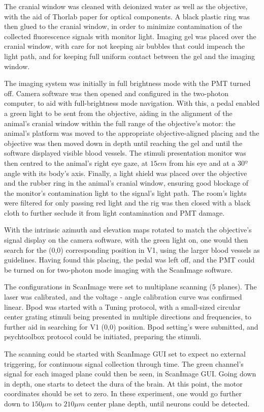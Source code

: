 The cranial window was cleaned with deionized water as well as the objective, with the aid of Thorlab paper for optical components. A black plastic ring was then glued to the cranial window, in order to minimize contamination of the collected fluorescence signals with monitor light. Imaging gel was placed over the cranial window, with care for not keeping air bubbles that could impeach the light path, and for keeping full uniform contact between the gel and the imaging window.

The imaging system was initially in full brightness mode with the PMT turned off. Camera software was then opened and configured in the two-photon computer, to aid with full-brightness mode navigation. With this, a pedal enabled a green light to be sent from the objective, aiding in the alignment of the animal's cranial window within the full range of the objective's motor: the animal's platform was moved to the appropriate objective-aligned placing and the objective was then moved down in depth until reaching the gel and until the software displayed visible blood vessels.
The stimuli presentation monitor was then centred to the animal's right eye gaze, at $15 cm$ from his eye and at a $30º$ angle with its body's axis. Finally, a light shield was placed over the objective and the rubber ring in the animal's cranial window, ensuring good blockage of the monitor's contamination light to the signal's light path. The room's lights were filtered for only passing red light and the rig was then closed with a black cloth to further seclude it from light contamination and PMT damage. 

With the intrinsic azimuth and elevation maps rotated to match the objective's signal display on the camera software, with the green light on, one would then search for the (0,0) corresponding position in V1, using the larger blood vessels as guidelines. Having found this placing, the pedal was left off, and the PMT could be turned on for two-photon mode imaging with the ScanImage software.

The configurations in ScanImage were set to multiplane scanning (5 planes). The laser was calibrated, and the voltage - angle calibration curve was confirmed linear. Bpod was started with a Tuning protocol, with a small-sized circular center grating stimuli being presented in multiple directions and frequencies, to further aid in searching for V1 (0,0) position. Bpod setting's were submitted, and psychtoolbox protocol could be initiated, preparing the stimuli.

The scanning could be started with ScanImage GUI set to expect no external triggering, for continuous signal collection through time. The green channel's signal for each imaged plane could then be seen, in ScanImage GUI. Going down in depth, one starts to detect the dura of the brain. At this point, the motor coordinates should be set to zero. 
In these experiment, one would go further down to $150 \mu m$ to $210 \mu m$ center plane depth, until neurons could be detected.

